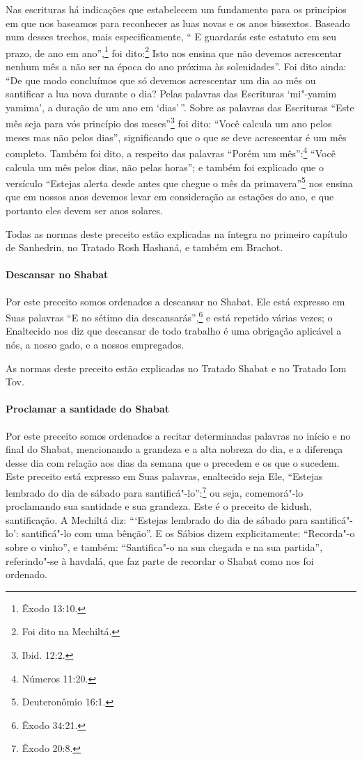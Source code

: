 \begin{multicols}{2}
Nas escrituras há indicações que estabelecem um fundamento para
os princípios em que nos baseamos para reconhecer as luas novas e os
anos bissextos. Baseado num desses trechos, mais especificamente, `` E
guardarás este estatuto em seu prazo, de ano em ano'',\footnote{Êxodo 13:10.} foi
dito:\footnote{Foi dito na Mechiltá\starr.} Isto nos
ensina que não devemos acrescentar nenhum mês a não ser na época do ano
próxima às solenidades''. Foi dito ainda: ``De que modo concluímos que
só devemos acrescentar um dia ao mês ou santificar a lua nova durante o dia?
Pelas palavras das Escrituras `mi"-yamim yamima', a duração de um ano em
`dias'\,''. Sobre as palavras das Escrituras ``Este mês seja para vós
princípio dos meses''\footnote{Ibid. 12:2.} foi dito: ``Você calcula um ano pelos
meses mas não pelos dias'', significando que o que se deve acrescentar é
um mês completo. Também foi dito, a respeito das palavras ``Porém um
mês'':\footnote{Números 11:20.} ``Você calcula um mês pelos dias, não pelas
horas''; e também foi explicado que o versículo ``Estejas alerta desde
antes que chegue o mês da primavera''\footnote{Deuteronômio 16:1.} nos ensina que
em nossos anos devemos levar em consideração as estações do ano, e que
portanto eles devem ser anos solares.

Todas as normas deste preceito estão explicadas na íntegra no primeiro
capítulo de Sanhedrin\starr, no Tratado Rosh Hashaná\starr, e também em Brachot\starr.

\paragraph{Descansar no Shabat}

Por este preceito somos ordenados a descansar no Shabat. Ele está
expresso em Suas palavras ``E no sétimo dia descansarás'',\footnote{Êxodo 34:21.}
e está repetido várias vezes; o Enaltecido nos diz que descansar de todo
trabalho é uma obrigação aplicável a nós, a nosso gado, e a nossos
empregados.

As normas deste preceito estão explicadas no Tratado Shabat e no Tratado
Iom Tov\starr.

\paragraph{Proclamar a santidade do Shabat}

Por este preceito somos ordenados a recitar determinadas palavras no
início e no final do Shabat, mencionando a grandeza e a alta nobreza do
dia, e a diferença desse dia com relação aos dias da semana que o
precedem e os que o sucedem. Este preceito está expresso em Suas
palavras, enaltecido seja Ele, ``Estejas lembrado do dia de sábado para
santificá"-lo'':\footnote{Êxodo 20:8.} ou seja, comemorá"-lo proclamando sua
santidade e sua grandeza. Este é o preceito de kidush\starr,
santificação. A Mechiltá\starr{} diz: ```Estejas lembrado do dia de sábado para
santificá"-lo': santificá"-lo com uma bênção''. E os Sábios dizem
explicitamente: ``Recorda"-o sobre o vinho'', e também: ``Santifica"-o na
sua chegada e na sua partida'', referindo"-se à havdalá\starr, que faz
parte de recordar o Shabat como nos foi ordenado.


\end{multicols}
